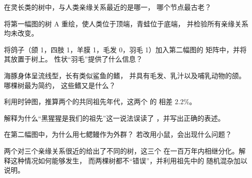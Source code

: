 \begin{exercise}[$\star$]\label{exo:g12:phylogenetic-trees:5}
在灵长类的树中，与人类亲缘关系最近的是哪一，
哪个节点最古老？
\end{exercise}

\begin{exercise}[$\star\star$]\label{exo:g12:phylogenetic-trees:6}
将第一幅图的树 A 重绘，使人类位于顶端，青蛙位于底端，
并检验所有亲缘关系均未改变。
\end{exercise}

\begin{exercise}[$\star\star$]\label{exo:g12:phylogenetic-trees:7}
将鸽子（颌 1，四肢 1，羊膜 1，毛发 0，羽毛 1）加入第二幅图的
矩阵中，并将其放置于树上。
性状“羽毛”提供了什么信息？
\end{exercise}

\begin{exercise}[$\star\star$]\label{exo:g12:phylogenetic-trees:8}
海豚身体呈流线型，长有类似鲨鱼的鳍，
并具有毛发、乳汁以及哺乳动物的颌。哪棵树最为简约，
这些鳍又是什么？
\end{exercise}

\begin{exercise}[$\star\star$]\label{exo:g12:phylogenetic-trees:9}
利用时钟图，推算两个的共同祖先年代，这两个
的  相差 2.2\%。
\end{exercise}

\begin{exercise}[$\star\star$]\label{exo:g12:phylogenetic-trees:10}
解释为什么“黑猩猩是我们的祖先”这一说法误读了
，并写出正确的表述。
\end{exercise}

\begin{exercise}[$\star\star$]\label{exo:g12:phylogenetic-trees:11}
在第二幅图中，为什么用七鳃鳗作为外群？
若改用小鼠，会出现什么问题？
\end{exercise}

\begin{exercise}[$\star\star\star$]\label{exo:g12:phylogenetic-trees:12}
两个对三个亲缘关系很近的给出了不同的树，这三个
在一百万年内相继分化。解释这种情况如何能够发生，
而两棵树都不“错误”，并利用祖先中的
随机混杂加以说明。
\end{exercise}

